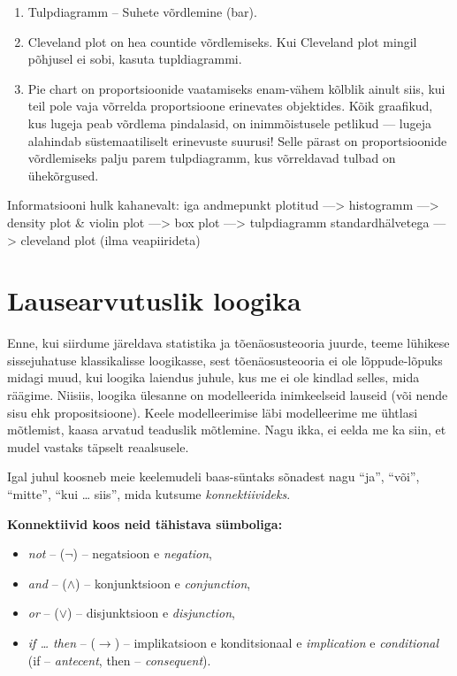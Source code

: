 \documentclass[]{book}
\begin{document}
\begin{enumerate}
\item
  Tulpdiagramm -- Suhete võrdlemine (bar).
\item
  Cleveland plot on hea countide võrdlemiseks. Kui Cleveland plot mingil põhjusel ei sobi, kasuta tupldiagrammi.
\item
  Pie chart on proportsioonide vaatamiseks enam-vähem kõlblik ainult siis, kui teil pole vaja võrrelda proportsioone erinevates objektides. Kõik graafikud, kus lugeja peab võrdlema pindalasid, on inimmõistusele petlikud --- lugeja alahindab süstemaatiliselt erinevuste suurusi! Selle pärast on proportsioonide võrdlemiseks palju parem tulpdiagramm, kus võrreldavad tulbad on ühekõrgused.
\end{enumerate}

Informatsiooni hulk kahanevalt:
iga andmepunkt plotitud ---\textgreater{}
histogramm ---\textgreater{}
density plot \& violin plot ---\textgreater{}
box plot ---\textgreater{}
tulpdiagramm standardhälvetega ---\textgreater{}
cleveland plot (ilma veapiirideta)

\hypertarget{lausearvutuslik-loogika}{%
\chapter{Lausearvutuslik loogika}\label{lausearvutuslik-loogika}}

Enne, kui siirdume järeldava statistika ja tõenäosusteooria juurde, teeme lühikese sissejuhatuse klassikalisse loogikasse, sest tõenäosusteooria ei ole lõppude-lõpuks midagi muud, kui loogika laiendus juhule, kus me ei ole kindlad selles, mida räägime.
Niisiis, loogika ülesanne on modelleerida inimkeelseid lauseid (või nende sisu ehk propositsioone). Keele modelleerimise läbi modelleerime me ühtlasi mõtlemist, kaasa arvatud teaduslik mõtlemine. Nagu ikka, ei eelda me ka siin, et mudel vastaks täpselt reaalsusele.

Igal juhul koosneb meie keelemudeli baas-süntaks sõnadest nagu ``ja'', ``või'', ``mitte'', ``kui \ldots{} siis'', mida kutsume \emph{konnektiivideks}.

\textbf{Konnektiivid koos neid tähistava sümboliga:}

\begin{itemize}
\item
  \emph{not} -- (\(\lnot\)) -- negatsioon e \emph{negation},
\item
  \emph{and} -- (\(\land\)) -- konjunktsioon e \emph{conjunction},
\item
  \emph{or} -- (\(\lor\)) -- disjunktsioon e \emph{disjunction},
\item
  \emph{if \ldots{} then} -- (\(\rightarrow\)) -- implikatsioon e konditsionaal e \emph{implication} e \emph{conditional} (if -- \emph{antecent}, then -- \emph{consequent}).
\end{itemize}
\end{document}
